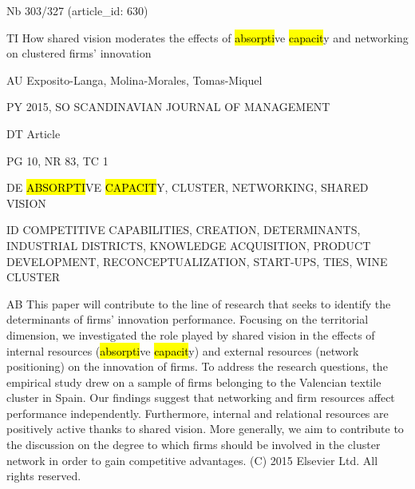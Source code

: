 \documentclass[a4paper]{article}
\begin{document}
\vspace*{-2cm}
Nb \tabto{0cm}303/327 (article\_id: 630)\par
TI \tabto{0cm}How shared vision moderates the effects of \hl{absorpti}ve \hl{capacit}y and networking on clustered firms' innovation\par
AU \tabto{0cm}Exposito-Langa, Molina-Morales, Tomas-Miquel\par
PY \tabto{0cm}2015, SO SCANDINAVIAN JOURNAL OF MANAGEMENT\par
DT \tabto{0cm}Article\par
PG \tabto{0cm}10, NR 83, TC 1\par
DE \tabto{0cm}\hl{ABSORPTI}VE \hl{CAPACIT}Y, CLUSTER, NETWORKING, SHARED VISION\par
ID \tabto{0cm}COMPETITIVE CAPABILITIES, CREATION, DETERMINANTS, INDUSTRIAL DISTRICTS, KNOWLEDGE ACQUISITION, PRODUCT DEVELOPMENT, RECONCEPTUALIZATION, START-UPS, TIES, WINE CLUSTER\par
AB \tabto{0cm}This paper will contribute to the line of research that seeks to identify the determinants of firms' innovation performance. Focusing on the territorial dimension, we investigated the role played by shared vision in the effects of internal resources (\hl{absorpti}ve \hl{capacit}y) and external resources (network positioning) on the innovation of firms. To address the research questions, the empirical study drew on a sample of firms belonging to the Valencian textile cluster in Spain. Our findings suggest that networking and firm resources affect performance independently. Furthermore, internal and relational resources are positively active thanks to shared vision. More generally, we aim to contribute to the discussion on the degree to which firms should be involved in the cluster network in order to gain competitive advantages. (C) 2015 Elsevier Ltd. All rights reserved.\par
\clearpage
\end{document}
